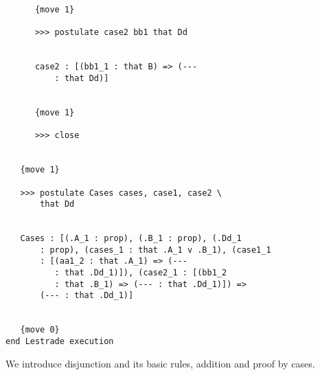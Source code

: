 \documentclass[12pt]{article}
\begin{document}
\begin{verbatim}
      {move 1}

      >>> postulate case2 bb1 that Dd


      case2 : [(bb1_1 : that B) => (--- 
          : that Dd)]


      {move 1}

      >>> close


   {move 1}

   >>> postulate Cases cases, case1, case2 \
       that Dd


   Cases : [(.A_1 : prop), (.B_1 : prop), (.Dd_1 
       : prop), (cases_1 : that .A_1 v .B_1), (case1_1 
       : [(aa1_2 : that .A_1) => (--- 
          : that .Dd_1)]), (case2_1 : [(bb1_2 
          : that .B_1) => (--- : that .Dd_1)]) => 
       (--- : that .Dd_1)]


   {move 0}
end Lestrade execution
\end{verbatim}

We introduce disjunction and its basic rules, addition and proof by cases.
\end{document}

